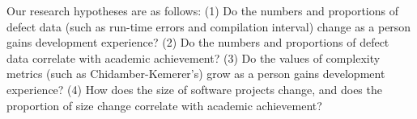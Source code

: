 Our research hypotheses are as follows: (1) Do the numbers and proportions
of defect data (such as run-time errors and compilation interval) change as 
a person gains development experience? (2) Do the numbers and 
proportions of defect data correlate with academic achievement? (3) Do
the values of complexity metrics (such as Chidamber-Kemerer's) grow as a
person gains development experience? (4) How does the size of software
projects change, and does the proportion of size change correlate with
academic achievement?




